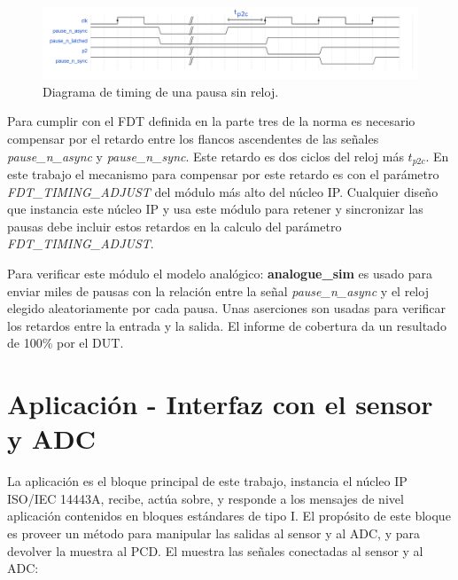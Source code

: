 \documentclass[a4paper, twoside, 11pt]{report}
\begin{document}
\begin{figure}[htb]
  \centering
  \includegraphics[width=1.0\textwidth]{./img/pause_latch_sync_dff_timing_1}
  \caption{Diagrama de timing de una pausa sin reloj.}
  \label{fig:pause_n_synch_and_latch_timing}
\end{figure}

Para cumplir con el FDT definida en la parte tres de la norma es necesario compensar por el retardo entre los flancos ascendentes de las señales \textit{pause\_n\_async} y \textit{pause\_n\_sync}. Este retardo es dos ciclos del reloj más $t_{p2c}$. En este trabajo el mecanismo para compensar por este retardo es con el parámetro \textit{FDT\_TIMING\_ADJUST} del módulo más alto del núcleo IP. Cualquier diseño que instancia este núcleo IP y usa este módulo para retener y sincronizar las pausas debe incluir estos retardos en la calculo del parámetro \textit{FDT\_TIMING\_ADJUST}.

Para verificar este módulo el modelo analógico: \textbf{analogue\_sim} es usado para enviar miles de pausas con la relación entre la señal \textit{pause\_n\_async} y el reloj elegido aleatoriamente por cada pausa. Unas aserciones son usadas para verificar los retardos entre la entrada y la salida. El informe de cobertura da un resultado de 100\% por el DUT.

\FloatBarrier
\section{Aplicación - Interfaz con el sensor y ADC}

La aplicación es el bloque principal de este trabajo, instancia el núcleo IP ISO/IEC 14443A, recibe, actúa sobre, y responde a los mensajes de nivel aplicación contenidos en bloques estándares de tipo I. El propósito de este bloque es proveer un método para manipular las salidas al sensor y al ADC, y para devolver la muestra al PCD. El  muestra las señales conectadas al sensor y al ADC:
\end{document}
